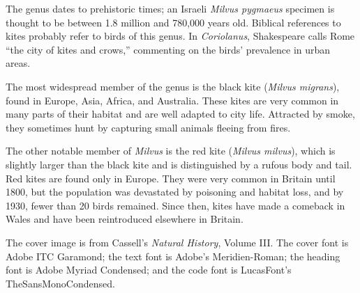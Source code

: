 \documentclass{Oreilly5980006}
\begin{document}
The genus dates to prehistoric times; an Israeli {\it Milvus pygmaeus} specimen is thought to be between 1.8 million and 780,000 years old.
Biblical references to kites probably refer to birds of this genus. In {\it Coriolanus}, Shakespeare calls Rome ``the city of kites and crows,''
commenting on the birds' prevalence in urban areas.

The most widespread member of the genus is the black kite ({\it Milvus migrans}), found in Europe, Asia, Africa, and Australia. These kites are
very common in many parts of their habitat and are well adapted to city life. Attracted by smoke, they sometimes hunt by capturing small
animals fleeing from fires.

The other notable member of {\it Milvus} is the red kite ({\it Milvus milvus}), which is slightly larger than the black kite and is distinguished by a
rufous body and tail. Red kites are found only in Europe. They were very common in Britain until 1800,\vadjust{\pagebreak} but the population was devastated
by poisoning and habitat loss, and by 1930, fewer than 20 birds remained. Since then, kites have made a comeback in Wales and have been
reintroduced elsewhere in Britain.

\thispagestyle{empty}


The cover image is from Cassell's {\it Natural History}, Volume III. The cover font is Adobe ITC Garamond; the text font is Adobe's Meridien-Roman; the
heading font is Adobe Myriad Condensed; and the code font is LucasFont's TheSansMonoCondensed.

\clearpage

\thispagestyle{empty}

\cleardoublepage
\end{document}

